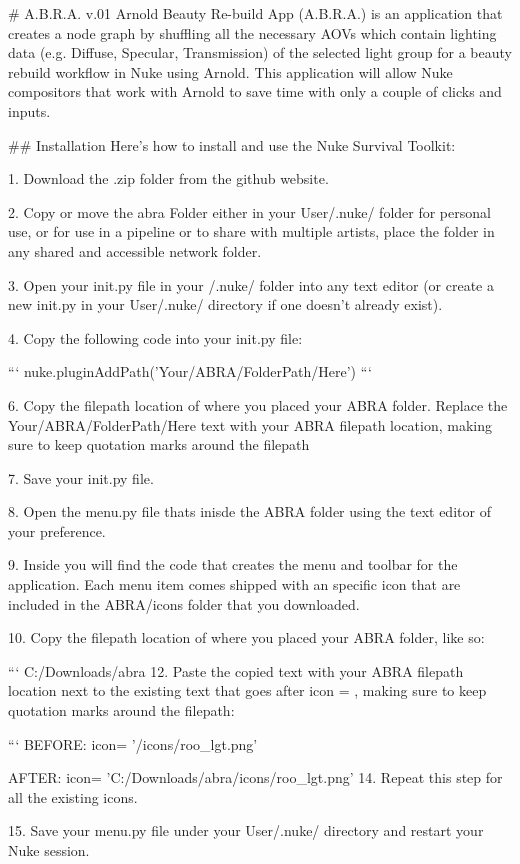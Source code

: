 # A.B.R.A. v.01
Arnold Beauty Re-build App (A.B.R.A.) is an application that creates a node graph by shuffling all the necessary AOVs which contain lighting data (e.g. Diffuse, Specular, Transmission) of the selected light group for a beauty rebuild workflow in Nuke using Arnold. This application will allow Nuke compositors that work with Arnold to save time with only a couple of clicks and inputs.

## Installation
Here’s how to install and use the Nuke Survival Toolkit:

1. Download the .zip folder from the github website.

2. Copy or move the abra Folder either in your User/.nuke/ folder for personal use, or for use in a pipeline or to share with multiple artists, place the folder in any shared and accessible network folder.

3. Open your init.py file in your /.nuke/ folder into any text editor (or create a new init.py in your User/.nuke/ directory if one doesn’t already exist).

4. Copy the following code into your init.py file:

    ```
   nuke.pluginAddPath('Your/ABRA/FolderPath/Here')
   ```

6. Copy the filepath location of where you placed your ABRA folder. Replace the Your/ABRA/FolderPath/Here text with your ABRA filepath location, making sure to keep quotation marks around the filepath

7. Save your init.py file.

8. Open the menu.py file thats inisde the ABRA folder using the text editor of your preference.

9. Inside you will find the code that creates the menu and toolbar for the application. Each menu item comes shipped with an specific icon that are included in the ABRA/icons folder that you downloaded.

10. Copy the filepath location of where you placed your ABRA folder, like so:

     ```
    C:/Downloads/abra
12. Paste the copied text with your ABRA filepath location next to the existing text that goes after icon = , making sure to keep quotation marks around the filepath:\

     ```
    BEFORE:
    icon= '/icons/roo_lgt.png'

    AFTER:
    icon= 'C:/Downloads/abra/icons/roo_lgt.png'
14. Repeat this step for all the existing icons.

15. Save your menu.py file under your User/.nuke/ directory and restart your Nuke session.

